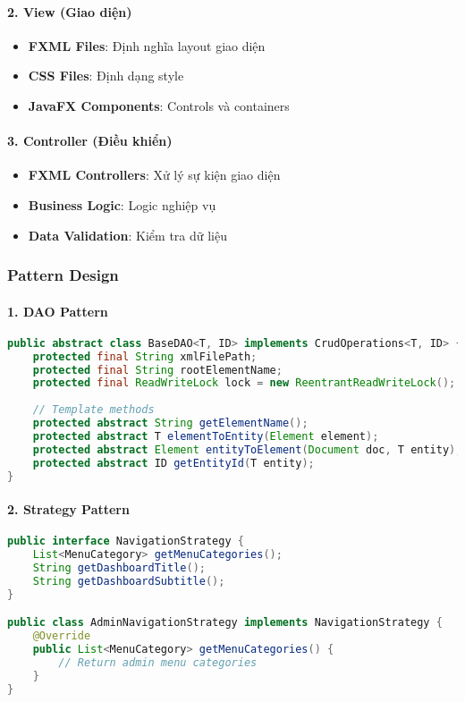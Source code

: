 \documentclass[12pt,a4paper]{article}
\begin{document}
\paragraph{2. View (Giao diện)}
\begin{itemize}
    \item \textbf{FXML Files}: Định nghĩa layout giao diện
    \item \textbf{CSS Files}: Định dạng style
    \item \textbf{JavaFX Components}: Controls và containers
\end{itemize}

\paragraph{3. Controller (Điều khiển)}
\begin{itemize}
    \item \textbf{FXML Controllers}: Xử lý sự kiện giao diện
    \item \textbf{Business Logic}: Logic nghiệp vụ
    \item \textbf{Data Validation}: Kiểm tra dữ liệu
\end{itemize}

\subsubsection{Pattern Design}

\paragraph{1. DAO Pattern}
\begin{lstlisting}[language=Java, caption=Ví dụ BaseDAO]
public abstract class BaseDAO<T, ID> implements CrudOperations<T, ID> {
    protected final String xmlFilePath;
    protected final String rootElementName;
    protected final ReadWriteLock lock = new ReentrantReadWriteLock();
    
    // Template methods
    protected abstract String getElementName();
    protected abstract T elementToEntity(Element element);
    protected abstract Element entityToElement(Document doc, T entity);
    protected abstract ID getEntityId(T entity);
}
\end{lstlisting}

\paragraph{2. Strategy Pattern}
\begin{lstlisting}[language=Java, caption=Ví dụ NavigationStrategy]
public interface NavigationStrategy {
    List<MenuCategory> getMenuCategories();
    String getDashboardTitle();
    String getDashboardSubtitle();
}

public class AdminNavigationStrategy implements NavigationStrategy {
    @Override
    public List<MenuCategory> getMenuCategories() {
        // Return admin menu categories
    }
}
\end{lstlisting}
\end{document}
